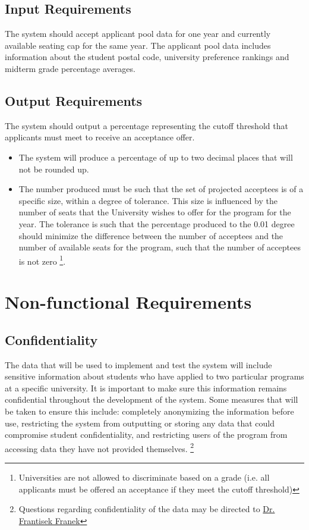 \documentclass{article}
\begin{document}
\begin{normalsize}
        \subsection{Input Requirements}
            The system should accept applicant pool data for one year and currently available seating cap for the same year. The applicant pool data includes information about the student postal code, university preference rankings and midterm grade percentage averages.
    	\subsection{Output Requirements}
            The system should output a percentage representing the cutoff threshold that applicants must meet to receive an acceptance offer.
            \begin{itemize}
                \item The system will produce a percentage of up to two decimal places that will not be rounded up.
                \item The number produced must be such that the set of projected acceptees is of a specific size, within a degree of tolerance. This size is influenced by the number of seats that the University wishes to offer for the program for the year. The tolerance is such that the percentage produced to the 0.01 degree should minimize the difference between the number of acceptees and the number of available seats for the program, such that the number of acceptees is not zero \footnote{Universities are not allowed to discriminate based on a grade (i.e. all applicants must be offered an acceptance if they meet the cutoff threshold)}.
            \end{itemize}

    \section{Non-functional Requirements}
    \subsection{Confidentiality}
        The data that will be used to implement and test the system will include sensitive information about students who have applied to two particular programs at a specific university. It is important to make sure this information remains confidential throughout the development of the system. Some measures that will be taken to ensure this include: completely anonymizing the information before use, restricting the system from outputting or storing any data that could compromise student confidentiality, and restricting users of the program from accessing data they have not provided themselves. \footnote{Questions regarding confidentiality of the data may be directed to \href{cas.mcmaster.ca/~franek/}{Dr. Frantisek Franek}}
        

\end{normalsize}
\end{document}
